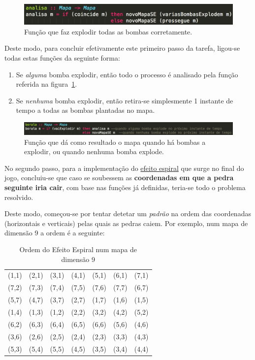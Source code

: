 \documentclass[a4paper]{article}
\begin{document}
\begin{figure}[H]
\centering 
\includegraphics[scale=0.40]{analisa}
\caption{Função que faz explodir todas as bombas corretamente.}
\label{img:analisa}
\end{figure}

Deste modo, para concluir efetivamente este primeiro passo da tarefa, 
ligou-se todas estas funções da seguinte forma:

\begin{enumerate} 
	\item Se \emph{alguma} bomba explodir, então todo o processo é analisado pela função referida na 
	figura~\ref{img:analisa}.
	\item Se \emph{nenhuma} bomba explodir, então retira-se simplesmente 1 instante de tempo a todas
	as bombas plantadas no mapa.
\end{enumerate}

\begin{figure}[H]
\centering 
\includegraphics[scale=0.40]{borala}
\caption{Função que dá como resultado o mapa quando há bombas a explodir, ou quando nenhuma bomba explode.}
\label{img:borala}
\end{figure}

No segundo passo, para a implementação do \underline{efeito espiral} que surge no 
final do jogo, concluiu-se que caso se soubessem as \textbf{coordenadas
em que a pedra seguinte iria cair}, com base nas funções já definidas, 
teria-se todo o problema resolvido.

Deste modo, começou-se por tentar detetar um \emph{padrão} na ordem das coordenadas 
(horizontais e verticais) pelas quais as pedras caiem. Por exemplo, num mapa de 
dimensão 9 a ordem é a seguinte:

\begin{table}[h]
\centering
\begin{tabular}[c]{ccccccc}
(1,1) & (2,1) & (3,1) & (4,1) & (5,1) & (6,1) & (7,1) \\
(7,2) & (7,3) & (7,4) & (7,5) & (7,6) & (7,7) & (6,7) \\
(5,7) & (4,7) & (3,7) & (2,7) & (1,7) & (1,6) & (1,5) \\
(1,4) & (1,3) & (1,2) & (2,2) & (3,2) & (4,2) & (5,2) \\ 
(6,2) & (6,3) & (6,4) & (6,5) & (6,6) & (5,6) & (4,6) \\
(3,6) & (2,6) & (2,5) & (2,4) & (2,3) & (3,3) & (4,3) \\
(5,3) & (5,4) & (5,5) & (4,5) & (3,5) & (3,4) & (4,4)
 \end{tabular}
\caption{Ordem do Efeito Espiral num mapa de dimensão 9} 
\label{table:espiral}
\end{table}
\end{document}
